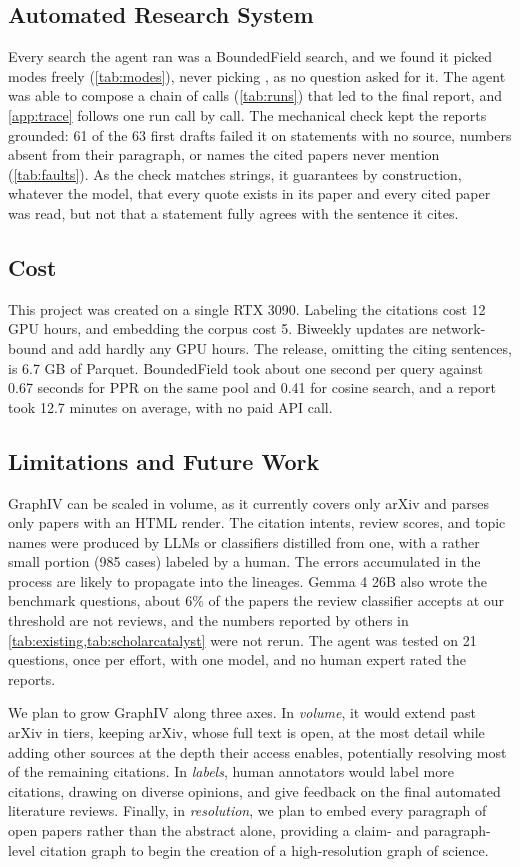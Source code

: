 \subsection{Automated Research System}
Every search the agent ran was a BoundedField search, and we found it picked modes freely (\cref{tab:modes}), never picking , as no question asked for it. The agent was able to compose a chain of calls (\cref{tab:runs}) that led to the final report, and \cref{app:trace} follows one run call by call. The mechanical check kept the reports grounded: 61 of the 63 first drafts failed it on statements with no source, numbers absent from their paragraph, or names the cited papers never mention (\cref{tab:faults}). As the check matches strings, it guarantees by construction, whatever the model, that every quote exists in its paper and every cited paper was read, but not that a statement fully agrees with the sentence it cites.

\subsection{Cost}
This project was created on a single RTX 3090. Labeling the citations cost 12 GPU hours, and embedding the corpus cost 5. Biweekly updates are network-bound and add hardly any GPU hours. The release, omitting the citing sentences, is 6.7 GB of Parquet. BoundedField took about one second per query against 0.67 seconds for PPR on the same pool and 0.41 for cosine search, and a  report took 12.7 minutes on average, with no paid API call.

\subsection{Limitations and Future Work}
GraphIV can be scaled in volume, as it currently covers only arXiv and parses only papers with an HTML render. The citation intents, review scores, and topic names were produced by LLMs or classifiers distilled from one, with a rather small portion (985 cases) labeled by a human. The errors accumulated in the process are likely to propagate into the lineages. Gemma 4 26B also wrote the benchmark questions, about 6\% of the papers the review classifier accepts at our threshold are not reviews, and the numbers reported by others in \cref{tab:existing,tab:scholarcatalyst} were not rerun. The agent was tested on 21 questions, once per effort, with one model, and no human expert rated the reports. 

We plan to grow GraphIV along three axes. In \emph{volume}, it would extend past arXiv in tiers, keeping arXiv, whose full text is open, at the most detail while adding other sources at the depth their access enables, potentially resolving most of the remaining citations. In \emph{labels}, human annotators would label more citations, drawing on diverse opinions, and give feedback on the final automated literature reviews. Finally, in \emph{resolution}, we plan to embed every paragraph of open papers rather than the abstract alone, providing a claim- and paragraph-level citation graph to begin the creation of a high-resolution graph of science.
